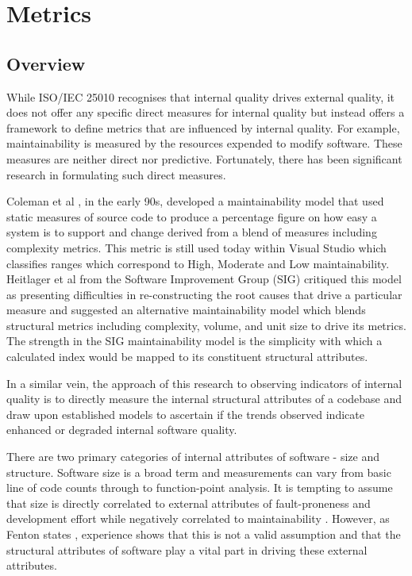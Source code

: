 \section{Metrics} %
\subsection{Overview}
While ISO/IEC 25010 recognises that internal quality drives external quality, it does not offer any specific direct measures for internal quality but instead offers a framework to define metrics that are influenced by internal quality. For example, maintainability is measured by the resources expended to modify software. These measures are neither direct nor predictive. Fortunately, there has been significant research in formulating such direct measures. 

Coleman et al \cite{coleman1994using}, in the early 90s, developed a maintainability model that used static measures of source code to produce a percentage figure on how easy  a system is to support and change derived from a blend of measures including complexity metrics. This metric is still used today within Visual Studio \cite{msdn2015code} which classifies ranges which correspond to High, Moderate and Low maintainability. Heitlager et al \cite{heitlager2007practical} from the Software Improvement Group (SIG) critiqued this model as presenting difficulties in re-constructing the root causes that drive a particular measure and suggested an alternative maintainability model which blends structural metrics including complexity, volume, and unit size to drive its metrics. The strength in the SIG maintainability model is the simplicity with which a calculated index would be mapped to its constituent structural attributes.

In a similar vein, the approach of this research to observing indicators of internal quality is to directly measure the internal structural attributes of a codebase and draw upon established models to ascertain if the trends observed indicate enhanced or degraded internal software quality.

There are two primary categories of internal attributes of software - size and structure. Software size is a broad term and measurements can vary from basic line of code counts through to function-point analysis. It is tempting to assume that size is directly correlated to external attributes of fault-proneness and development effort while negatively correlated to maintainability \cite{akiyama1971example}. However, as Fenton states \cite{fenton2014software}, experience shows that this is not a valid assumption and that the structural attributes of software play a vital part in driving these external attributes.
 
